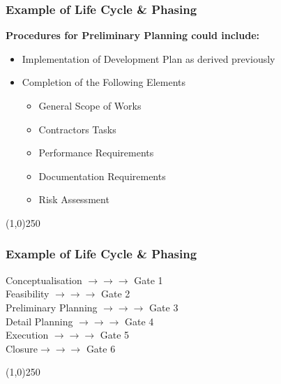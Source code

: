 \begin{frame}
\frametitle{Example of Life Cycle \& Phasing}
\textbf{Procedures for Preliminary Planning could include:}\\
\begin{itemize}
	\item Implementation of Development Plan as derived previously
	\item Completion of the Following Elements
	\begin{itemize}
		\item General Scope of Works
		\item Contractors Tasks
		\item Performance Requirements
		\item Documentation Requirements
		\item Risk Assessment
	\end{itemize}
\end{itemize}
\end{frame}
\begin{center}\line(1,0){250}\end{center}



\begin{frame}
\frametitle{Example of Life Cycle \& Phasing}
Conceptualisation \hfill$\longrightarrow\longrightarrow\longrightarrow$ Gate 1\\
Feasibility \hfill$\longrightarrow\longrightarrow\longrightarrow$ Gate 2\\
Preliminary Planning \hfill$\longrightarrow\longrightarrow\longrightarrow$ Gate 3\\
Detail Planning \hfill$\longrightarrow\longrightarrow\longrightarrow$ Gate 4\\
Execution \hfill$\longrightarrow\longrightarrow\longrightarrow$ Gate 5\\
Closure\hfill$\longrightarrow\longrightarrow\longrightarrow$ Gate 6\\
\end{frame}
\begin{center}\line(1,0){250}\end{center}




